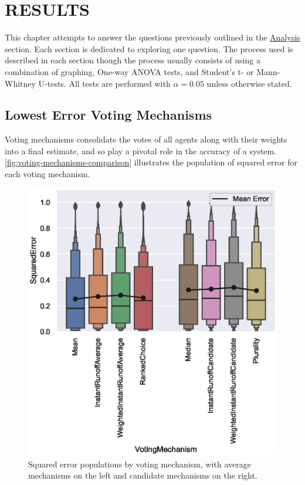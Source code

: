 %
%

\chapter{RESULTS}\label{ch:results}
This chapter attempts to answer the questions previously outlined in the
\hyperref[subsec:analysis]{Analysis} section.
Each section is dedicated to exploring one question.
The process used is described in each section though the process usually
consists of using a combination of graphing, One-way ANOVA tests, and
Student's t- or Mann-Whitney U-tests.
All tests are performed with $\alpha = 0.05$ unless otherwise stated.


\section{Lowest Error Voting Mechanisms}\label{sec:lowest-error-voting-mechanism}
Voting mechanisms consolidate the votes of all agents along with their weights
into a final estimate, and so play a pivotal role in the accuracy of a system.
\autoref{fig:voting-mechanisms-comparison} illustrates the population of
squared error for each voting mechanism.

\begin{figure}[htbp]
    \centering
    \includegraphics[scale=0.75]
    {./content/figures/voting_mechanisms_comparison}
    \caption{Squared error populations by voting mechanism, with average
    mechanisms on the left and candidate mechanisms on the right.}
    \label{fig:voting-mechanisms-comparison}
\end{figure}

